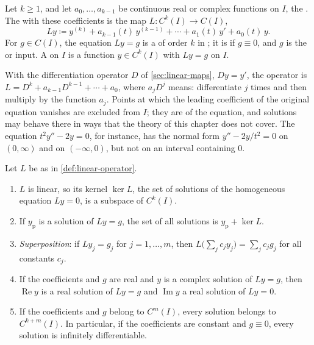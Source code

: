 \begin{definition}
\label{def:linear-operator}
Let $k\ge1$, and let $a_0,\ldots,a_{k-1}$ be continuous real or complex functions on $I$, the . The  with these coefficients is the map $L\colon C^k(I)\to C(I)$,
\begin{equation}
Ly\coloneqq y^{(k)}+a_{k-1}(t)\,y^{(k-1)}+\cdots+a_1(t)\,y'+a_0(t)\,y .
\label{eq:linear-operator}
\end{equation}
For $g\in C(I)$, the equation $Ly=g$ is a  of order $k$ in ; it is  if $g\equiv0$, and $g$ is the  or input. A  on $I$ is a function $y\in C^k(I)$ with $Ly=g$ on $I$.
\end{definition}

With the differentiation operator $D$ of \cref{sec:linear-maps}, $Dy=y'$, the operator is $L=D^k+a_{k-1}D^{k-1}+\cdots+a_0$, where $a_jD^j$ means: differentiate $j$ times and then multiply by the function $a_j$. Points at which the leading coefficient of the original equation vanishes are excluded from $I$; they are  of the equation, and solutions may behave there in ways that the theory of this chapter does not cover. The equation $t^2y''-2y=0$, for instance, has the normal form $y''-2y/t^2=0$ on $(0,\infty)$ and on $(-\infty,0)$, but not on an interval containing $0$.

\begin{proposition}[Linearity]
\label{prop:linear-structure}
Let $L$ be as in \cref{def:linear-operator}.
\begin{enumerate}
\item $L$ is linear, so its kernel $\ker L$, the set of solutions of the homogeneous equation $Ly=0$, is a subspace of $C^k(I)$.
\item If $y_{\mathrm p}$ is a solution of $Ly=g$, the set of all solutions is $y_{\mathrm p}+\ker L$.
\item \emph{Superposition}: if $Ly_j=g_j$ for $j=1,\ldots,m$, then $L\bigl(\sum_jc_jy_j\bigr)=\sum_jc_jg_j$ for all constants $c_j$.
\item If the coefficients and $g$ are real and $y$ is a complex solution of $Ly=g$, then $\operatorname{Re}y$ is a real solution of $Ly=g$ and $\operatorname{Im}y$ a real solution of $Ly=0$.
\item If the coefficients and $g$ belong to $C^m(I)$, every solution belongs to $C^{k+m}(I)$. In particular, if the coefficients are constant and $g\equiv0$, every solution is infinitely differentiable.
\end{enumerate}
\end{proposition}

